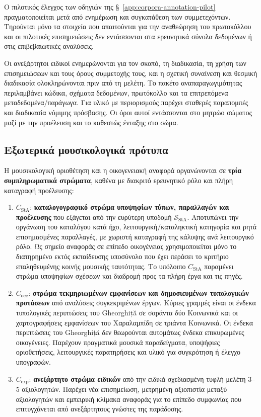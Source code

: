 \documentclass[11pt,a4paper]{article}
\begin{document}
Ο πιλοτικός έλεγχος των οδηγιών της §~\ref{app:corpora-annotation-pilot} πραγματοποιείται μετά από ενημέρωση και συγκατάθεση των συμμετεχόντων. Τηρούνται μόνο τα στοιχεία που απαιτούνται για την αναθεώρηση του πρωτοκόλλου και οι πιλοτικές επισημειώσεις δεν εντάσσονται στα ερευνητικά σύνολα δεδομένων ή στις επιβεβαιωτικές αναλύσεις.

Οι ανεξάρτητοι ειδικοί ενημερώνονται για τον σκοπό, τη διαδικασία, τη χρήση των επισημειώσεων και τους όρους συμμετοχής τους, και η σχετική συναίνεση και θεσμική διαδικασία ολοκληρώνονται πριν από τη μελέτη. Το πακέτο αναπαραγωγιμότητας περιλαμβάνει κώδικα, σχήματα δεδομένων, πρωτόκολλο και τα επιτρεπόμενα μεταδεδομένα/παράγωγα. Για υλικό με περιορισμούς παρέχει σταθερές παραπομπές και διαδικασία νόμιμης πρόσβασης. Οι όροι αυτοί εντάσσονται στο μητρώο σώματος μαζί με την προέλευση και το καθεστώς ένταξης στο σώμα.

\subsection{Εξωτερικά μουσικολογικά πρότυπα}\label{app:corpora-extrefs}

Η μουσικολογική οριοθέτηση και η οικογενειακή αναφορά οργανώνονται σε \textbf{τρία συμπληρωματικά στρώματα}, καθένα με διακριτό ερευνητικό ρόλο και πλήρη καταγραφή προέλευσης:

\begin{enumerate}
\item \(C_{\mathrm{StA}}\): \textbf{καταλογογραφικό στρώμα υποψηφίων τύπων, παραλλαγών και προέλευσης} που εξάγεται από την ευρύτερη υποδομή $\mathcal S_{\mathrm{StA}}$. Αποτυπώνει την οργάνωση του καταλόγου κατά ήχο, λειτουργική/καταληκτική κατηγορία και ρητά επισημασμένες παραλλαγές, με χωριστή καταγραφή της κάλυψης ανά λειτουργικό ρόλο. Ως σημείο αναφοράς σε επίπεδο οικογένειας χρησιμοποιείται μόνο το διατηρημένο εκτός εκπαίδευσης υποσύνολο που έχει περάσει το κριτήριο επαληθευμένης κοινής μουσικής ταυτότητας. Το υπόλοιπο $C_{\mathrm{StA}}$ παραμένει στρώμα υποψηφίων σχέσεων και διαδρομή προς τα πλήρη έργα και τις πηγές.
\item \(C_{\mathrm{occ}}\): \textbf{στρώμα τεκμηριωμένων εμφανίσεων και δημοσιευμένων τυπολογικών προτάσεων} από αναλύσεις συγκεκριμένων έργων. Κύριες γραμμές είναι οι ένδεκα τυπολογικές περιπτώσεις του Gheorghiță σε σαράντα δύο Κοινωνικά και οι χαρτογραφήσεις εμφανίσεων του Χαραλαμπίδη σε τριάντα Κοινωνικά. Οι ένδεκα περιπτώσεις του Gheorghiță δεν θεωρούνται αυτομάτως ένδεκα επικυρωμένες οικογένειες. Παρέχουν πραγματικά μουσικά παραδείγματα, υποψήφιες οριοθετήσεις, λειτουργικές παρατηρήσεις και υλικό για συγκρότηση ή έλεγχο υπογραφών.
\item \(C_{\mathrm{exp}}\): \textbf{ανεξάρτητο στρώμα ειδικών} από την ειδικά σχεδιασμένη τυφλή μελέτη 3--5 αξιολογητών. Παρέχει νέα επισημείωση, μετρημένη αξιοπιστία μεταξύ αξιολογητών και εμπειρική κλίμακα αναφοράς για το επίπεδο συμφωνίας που επιτυγχάνεται από ανεξάρτητους γνώστες της παράδοσης.
\end{enumerate}
\end{document}
